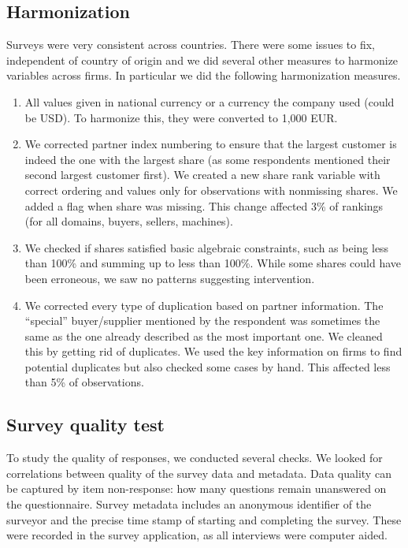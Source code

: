 \documentclass[final, dvipsnames, authoryear,12pt]{elsarticle}
\begin{document}
\subsection{Harmonization} 

Surveys were very consistent across countries. There were some issues to fix, independent of country of origin and we did several other measures to harmonize variables across firms. In particular we did the following harmonization measures.

\begin{enumerate}
    \item All values given in national currency or a currency the company used (could be USD). To harmonize this, they were converted to 1,000 EUR. 
    
    \item We corrected partner index numbering to ensure that the largest customer is indeed the one with the largest share (as some respondents mentioned their second largest customer first). We created a new share rank variable with correct ordering and values only for observations with nonmissing shares. We added a flag when share was missing. This change affected 3\% of rankings (for all domains, buyers, sellers, machines). 
    
    \item We checked if shares satisfied basic algebraic constraints, such as being less than 100\% and summing up to less than 100\%. While some shares could have been erroneous, we saw no patterns suggesting intervention.
    
    \item We corrected every type of duplication based on partner information. The ``special'' buyer/supplier mentioned by the respondent was sometimes the same as the one already described as the most important one. We cleaned this by getting rid of duplicates. We used the key information on firms to find potential duplicates but also checked some cases by hand. This affected less than 5\% of observations.

\end{enumerate}

\subsection{Survey quality test}
To study the quality of responses, we conducted several checks. We looked for correlations between quality of the survey data and metadata. Data quality can be captured by item non-response: how many questions remain unanswered on the questionnaire. Survey metadata includes an anonymous identifier of the surveyor and the precise time stamp of starting and completing the survey. These were recorded in the survey application, as all interviews were computer aided. 
\end{document}
